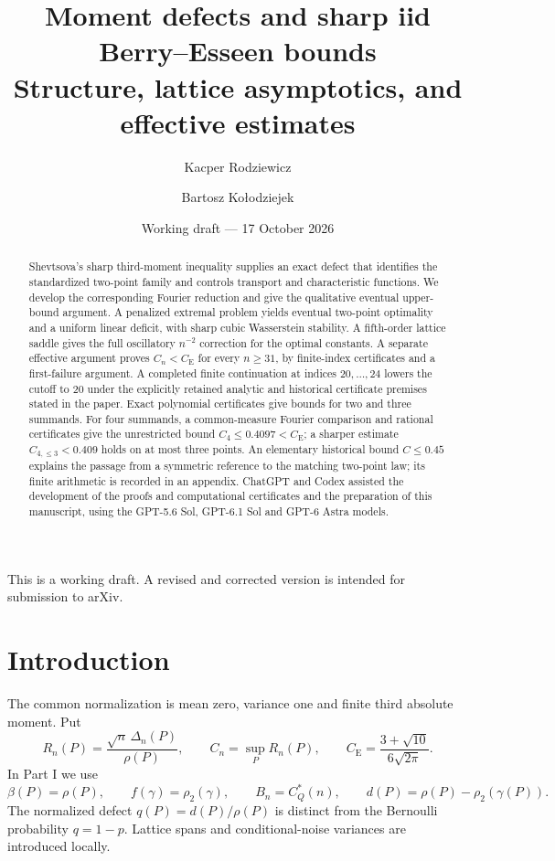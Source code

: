 \documentclass[11pt,a4paper]{article}
\title{Moment defects and sharp iid Berry--Esseen bounds\\
\large Structure, lattice asymptotics, and effective estimates}
\author{Kacper Rodziewicz \and Bartosz Ko{\l}odziejek}
\date{Working draft --- 17 October 2026}
\numberwithin{equation}{section}
\theoremstyle{definition}
\theoremstyle{remark}
\begin{document}
\maketitle
\begin{center}\small
This is a working draft. A revised and corrected version is intended
for submission to arXiv.
\end{center}
\begin{abstract}
Shevtsova's sharp third-moment inequality supplies an exact defect
that identifies the standardized two-point family and controls
transport and characteristic functions. We develop the
corresponding Fourier reduction and give the qualitative
eventual upper-bound argument. A penalized extremal problem yields
eventual two-point optimality and a uniform linear deficit, with sharp
cubic Wasserstein stability. A fifth-order lattice saddle gives the
full oscillatory \(n^{-2}\) correction for the optimal constants.
A separate effective argument proves \(C_n<C_{\mathrm E}\) for every
\(n\ge31\), by finite-index certificates and a first-failure argument.
A completed finite continuation at indices \(20,\ldots,24\) lowers
the cutoff to 20 under the explicitly retained analytic and historical
certificate premises stated in the paper.
Exact polynomial certificates give bounds for two and three summands.
For four summands, a common-measure Fourier comparison and rational
certificates give the unrestricted bound \(C_4\le0.4097<C_{\mathrm E}\);
a sharper estimate \(C_{4,\le3}<0.409\) holds on at most three points.
An elementary historical bound \(C\le0.45\) explains the passage from
a symmetric reference to the matching two-point law; its finite
arithmetic is recorded in an appendix.
ChatGPT and Codex assisted the development of the proofs and computational
certificates and the preparation of this manuscript, using the
GPT-5.6 Sol, GPT-6.1 Sol and GPT-6 Astra models.
\end{abstract}
\clearpage
\section*{Introduction}
The common normalization is mean zero, variance one and finite
third absolute moment. Put
\[
 R_n(P)=\frac{\sqrt n\,\Delta_n(P)}{\rho(P)},\qquad
 C_n=\sup_P R_n(P),\qquad
 C_{\mathrm E}=\frac{3+\sqrt{10}}{6\sqrt{2\pi}}.
\]
In Part I we use
\[
 \beta(P)=\rho(P),\qquad f(\gamma)=\rho_2(\gamma),\qquad
 B_n=C_Q^*(n),\qquad d(P)=\rho(P)-\rho_2(\gamma(P)).
\]
The normalized defect \(q(P)=d(P)/\rho(P)\) is distinct from the
Bernoulli probability \(q=1-p\). Lattice spans and conditional-noise
variances are introduced locally.
\end{document}

